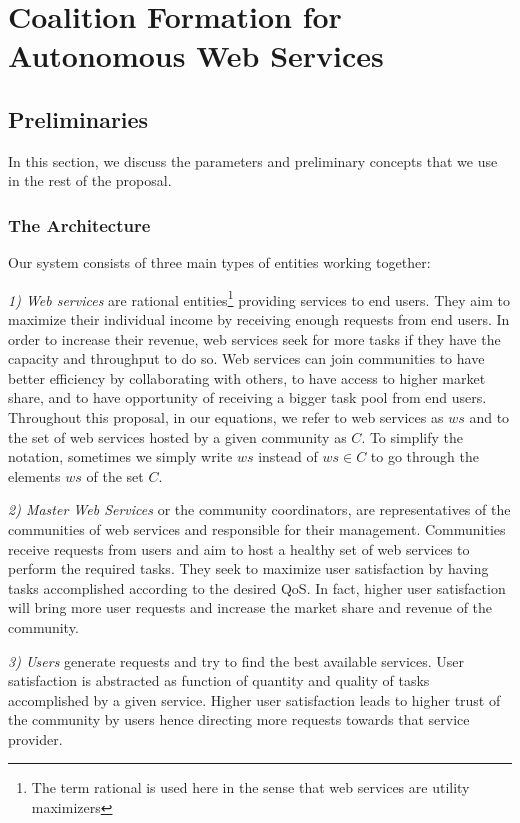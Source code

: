 \setcounter{chapter}{2}

\chapter{Coalition Formation for Autonomous Web Services}\label{sec:coalitionformationws}

\section{Preliminaries}\label{s:preliminaries}

In this section, we discuss the parameters and preliminary
concepts that we use in the rest of the proposal.

\subsection{The Architecture}

Our system consists of three main types of entities working
together:

\emph{1) Web services} are rational entities\footnote{The term
rational is used here in the sense that web services are utility
maximizers} providing services to end users. They aim to maximize
their individual income by receiving enough requests from end
users. In order to increase their revenue, web services seek for
more tasks if they have the capacity and throughput to do so. Web
services can join communities to have better efficiency by
collaborating with others, to have access to higher market share,
and to have opportunity of receiving a bigger task pool from end
users. Throughout this proposal, in
our equations, we refer to web services as $ws$ and to the set of
web services hosted by a given community as $C$. To simplify the
notation, sometimes we simply write $ws$ instead of $ws \in C$ to
go through the elements $ws$ of the set $C$.

\emph{2) Master Web Services} or the community coordinators, are representatives of the
communities of web services and responsible for their management.
Communities receive requests from users and aim to host a healthy
set of web services to perform the required tasks. They seek to
maximize user satisfaction by having tasks accomplished according
to the desired QoS. In fact, higher user satisfaction will bring
more user requests and increase the market share and revenue of
the community.

\emph{3) Users} generate requests and try to find the best
available services. User satisfaction is abstracted as function of
quantity and quality of tasks accomplished by a given service.
Higher user satisfaction leads to higher trust of the community by users hence directing more requests towards that service provider.

